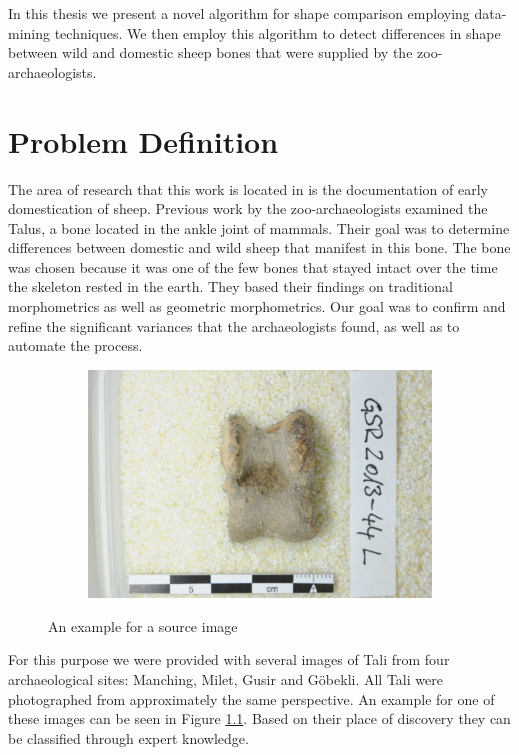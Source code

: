 \documentclass[pdftex,12pt,a4paper]{report}
\begin{document}
In this thesis we present a novel algorithm for shape comparison employing data-mining techniques. We then employ this algorithm to detect differences in shape between wild and domestic sheep bones that were supplied by the zoo-archaeologists.

\chapter{Problem Definition}
\label{chapter:problem-definition}

The area of research that this work is located in is the documentation of early domestication of sheep. Previous work by the zoo-archaeologists examined the Talus, a bone located in the ankle joint of mammals. Their goal was to determine differences between domestic and wild sheep that manifest in this bone. The bone was chosen because it was one of the few bones that stayed intact over the time the skeleton rested in the earth. They based their findings on traditional morphometrics as well as geometric morphometrics. Our goal was to confirm and refine the significant variances that the archaeologists found, as well as to automate the process.

\begin{figure}[h]
	\centering
	\begin{subfigure}[b]{0.65\textwidth}
		\centering
		\includegraphics[width=.9\linewidth]{img/example.jpg}
	\end{subfigure}
	\caption{An example for a source image}
	\label{fig:problem-example}
\end{figure}


For this purpose we were provided with several images of Tali from four archaeological sites: Manching, Milet, Gusir and Göbekli. All Tali were photographed from approximately the same perspective. An example for one of these images can be seen in Figure \ref{fig:problem-example}. Based on their place of discovery they can be classified through expert knowledge.
\end{document}
